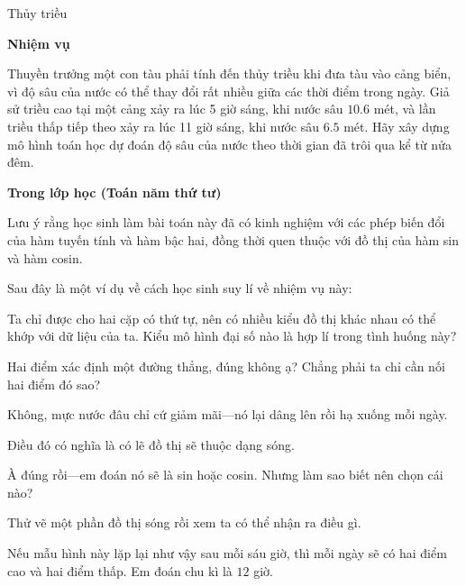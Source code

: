   {
    Thủy triều
  }
  {
    \textbf{Nhiệm vụ}

    Thuyền trưởng một con tàu phải tính đến thủy triều khi đưa tàu vào cảng biển, vì độ sâu của nước có thể thay đổi rất nhiều giữa các thời điểm trong ngày. Giả sử triều cao tại một cảng xảy ra lúc 5 giờ sáng, khi nước sâu $10.6$ mét, và lần triều thấp tiếp theo xảy ra lúc 11 giờ sáng, khi nước sâu $6.5$ mét. Hãy xây dựng mô hình toán học dự đoán độ sâu của nước theo thời gian đã trôi qua kể từ nửa đêm.\vspace{\baselineskip}

    \textbf{Trong lớp học (Toán năm thứ tư)}\vspace{\baselineskip}

    Lưu ý rằng học sinh làm bài toán này đã có kinh nghiệm với các phép biến đổi của hàm tuyến tính và hàm bậc hai, đồng thời quen thuộc với đồ thị của hàm sin và hàm cosin.\vspace{\baselineskip}

    Sau đây là một ví dụ về cách học sinh suy lí về nhiệm vụ này:

    \begin{scriptlist}
      \item [Giáo viên:] Ta chỉ được cho hai cặp có thứ tự, nên có nhiều kiểu đồ thị khác nhau có thể khớp với dữ liệu của ta. Kiểu mô hình đại số nào là hợp lí trong tình huống này?

      \item [Học sinh 1:] Hai điểm xác định một đường thẳng, đúng không ạ? Chẳng phải ta chỉ cần nối hai điểm đó sao?

      \item [Học sinh 2:] Không, mực nước đâu chỉ cứ giảm mãi---nó lại dâng lên rồi hạ xuống mỗi ngày.\vspace{\baselineskip}

      \item [Học sinh 3:] Điều đó có nghĩa là có lẽ đồ thị sẽ thuộc dạng sóng.\vspace{\baselineskip}

      \item [Học sinh 1:] À đúng rồi---em đoán nó sẽ là sin hoặc cosin. Nhưng làm sao biết nên chọn cái nào?

      \item [Học sinh 3:] Thử vẽ một phần đồ thị sóng rồi xem ta có thể nhận ra điều gì.

      \item [Học sinh 2:] Nếu mẫu hình này lặp lại như vậy sau mỗi sáu giờ, thì mỗi ngày sẽ có hai điểm cao và hai điểm thấp. Em đoán chu kì là $12$ giờ.\vspace{\baselineskip}


\end{scriptlist}}
